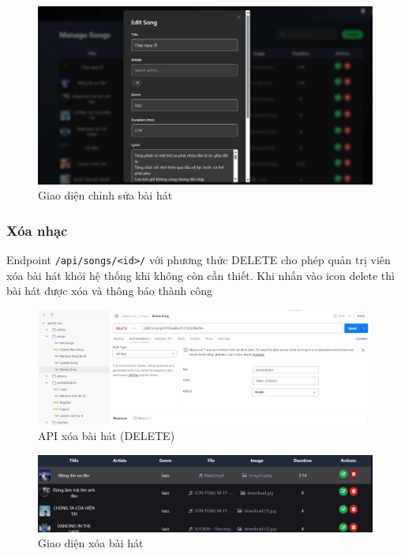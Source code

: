 \begin{figure}[H]
    \centering
    \includegraphics[width=1\textwidth]{imgs/frontend-edit-song.jpg}
    \caption{Giao diện chỉnh sửa bài hát}
\end{figure}

\subsubsection{Xóa nhạc}
Endpoint \texttt{/api/songs/<id>/} với phương thức DELETE cho phép quản trị viên xóa bài hát khỏi hệ thống khi không còn cần thiết. Khi nhấn vào icon delete thì bài hát được xóa và thông báo thành công

\begin{figure}[H]
    \centering
    \includegraphics[width=1\textwidth]{imgs/api-delete-song.jpg}
    \caption{API xóa bài hát (DELETE)}
\end{figure}

\begin{figure}[H]
    \centering
    \includegraphics[width=1\textwidth]{imgs/frontend-delete-song.jpg}
    \caption{Giao diện xóa bài hát}
\end{figure}

